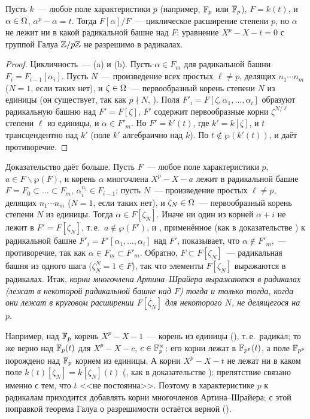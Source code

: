 \begin{corollary}[5.32j]
Пусть $k$~--- любое поле характеристики $p$ (например, $\mathbb F_p$ или $\overline{\mathbb F}_p$), $F=k(t)$, и $\alpha\in\Omega$, $\alpha^p-\alpha=t$.
Тогда $F[\alpha]/F$~--- циклическое расширение степени $p$, но $\alpha$ не лежит ни в какой радикальной башне над $F$:
уравнение $X^p-X-t=0$ с группой Галуа $\mathbb Z/p\mathbb Z$ не разрешимо в радикалах.
\end{corollary}

\begin{proof}
Цикличность~--- (a) и (b). Пусть $\alpha\in F_m$ для радикальной башни $F_i=F_{i-1}[\alpha_i]$. Пусть $N$~---
произведение всех простых $\ell\ne p$, делящих $n_1\cdots n_m$ ($N=1$, если таких нет), и $\zeta\in\Omega$~--- первообразный
корень степени $N$ из единицы (он существует, так как $p\nmid N$, ). Поля $F'_i=F[\zeta,\alpha_1,\dots,\alpha_i]$ образуют
радикальную башню над $F'=F[\zeta]$, $F'$ содержит первообразные корни $\zeta^{N/\ell}$ степени $\ell$ из единицы, и
$\alpha\in F'_m$. Но $F'=k'(t)$, где $k'=k[\zeta]$, и $t$ трансцендентно над $k'$ (поле $k'$ алгебраично над $k$). По
 $t\notin\wp(k'(t))$, и  даёт противоречие.
\end{proof}

Доказательство  даёт больше. Пусть $F$~--- любое поле характеристики $p$, $a\in F\smallsetminus\wp(F)$, и корень
$\alpha$ многочлена $X^p-X-a$ лежит в радикальной башне $F=F_0\subset\dots\subset F_m$, $\alpha_i^{n_i}\in F_{i-1}$; пусть
$N$~--- произведение простых $\ell\ne p$, делящих $n_1\cdots n_m$ ($N=1$, если таких нет), и $\zeta_N\in\Omega$~---
первообразный корень степени $N$ из единицы. Тогда $\alpha\in F[\zeta_N]$. Иначе ни один из корней $\alpha+i$ не лежит в $F'=F[\zeta_N]$, т.\,е.\
$a\notin\wp(F')$, и , применённое (как в доказательстве ) к радикальной башне $F'_i=F'[\alpha_1,\dots,\alpha_i]$
над $F'$, показывает, что $\alpha\notin F'_m$,~--- противоречие, так как $\alpha\in F_m\subset F'_m$. Обратно,
$F\subset F[\zeta_N]$~--- радикальная башня из одного шага ($\zeta_N^N=1\in F$), так что элементы $F[\zeta_N]$ выражаются в
радикалах. Итак, \emph{корни многочлена Артина--Шрайера выражаются в радикалах \textup(лежат в некоторой радикальной
башне над $F$\textup) тогда и только тогда, когда они лежат в круговом расширении $F[\zeta_N]$ для некоторого $N$, не
делящегося на $p$}.

Например, над $\mathbb F_p$ корень $X^p-X-1$~--- корень из единицы (), т.\,е.\ радикал; то же верно над $\mathbb F_p(t)$ для
$X^p-X-c$, $c\in\mathbb F_p^\times$: его корни лежат в $\mathbb F_{p^p}(t)$, а поле $\mathbb F_{p^p}$ порождено над $\mathbb F_p$ корнем из единицы.
А корни $X^p-X-t$ не лежат ни в каком поле $k(t)[\zeta_N]=k[\zeta_N](t)$ (\rf{5.32h}, как в доказательстве \rf{5.32j}):
препятствие связано именно с тем, что $t$ <<не постоянна>>. Поэтому в характеристике $p$ к радикалам приходится добавлять
корни многочленов Артина--Шрайера; с этой поправкой теорема Галуа о разрешимости остаётся верной (\rf{5.35b}).

